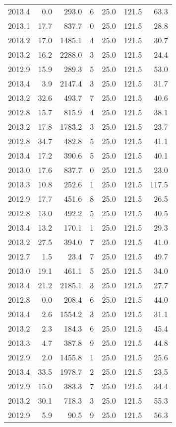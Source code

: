 \begin{tabular}{rrrrrrr}
2013.4 & 0.0 & 293.0 & 6 & 25.0 & 121.5 & 63.3 \\
2013.1 & 17.7 & 837.7 & 0 & 25.0 & 121.5 & 28.8 \\
2013.2 & 17.0 & 1485.1 & 4 & 25.0 & 121.5 & 30.7 \\
2013.2 & 16.2 & 2288.0 & 3 & 25.0 & 121.5 & 24.4 \\
2012.9 & 15.9 & 289.3 & 5 & 25.0 & 121.5 & 53.0 \\
2013.4 & 3.9 & 2147.4 & 3 & 25.0 & 121.5 & 31.7 \\
2013.2 & 32.6 & 493.7 & 7 & 25.0 & 121.5 & 40.6 \\
2012.8 & 15.7 & 815.9 & 4 & 25.0 & 121.5 & 38.1 \\
2013.2 & 17.8 & 1783.2 & 3 & 25.0 & 121.5 & 23.7 \\
2012.8 & 34.7 & 482.8 & 5 & 25.0 & 121.5 & 41.1 \\
2013.4 & 17.2 & 390.6 & 5 & 25.0 & 121.5 & 40.1 \\
2013.0 & 17.6 & 837.7 & 0 & 25.0 & 121.5 & 23.0 \\
2013.3 & 10.8 & 252.6 & 1 & 25.0 & 121.5 & 117.5 \\
2012.9 & 17.7 & 451.6 & 8 & 25.0 & 121.5 & 26.5 \\
2012.8 & 13.0 & 492.2 & 5 & 25.0 & 121.5 & 40.5 \\
2013.4 & 13.2 & 170.1 & 1 & 25.0 & 121.5 & 29.3 \\
2013.2 & 27.5 & 394.0 & 7 & 25.0 & 121.5 & 41.0 \\
2012.7 & 1.5 & 23.4 & 7 & 25.0 & 121.5 & 49.7 \\
2013.0 & 19.1 & 461.1 & 5 & 25.0 & 121.5 & 34.0 \\
2013.4 & 21.2 & 2185.1 & 3 & 25.0 & 121.5 & 27.7 \\
2012.8 & 0.0 & 208.4 & 6 & 25.0 & 121.5 & 44.0 \\
2013.4 & 2.6 & 1554.2 & 3 & 25.0 & 121.5 & 31.1 \\
2013.2 & 2.3 & 184.3 & 6 & 25.0 & 121.5 & 45.4 \\
2013.3 & 4.7 & 387.8 & 9 & 25.0 & 121.5 & 44.8 \\
2012.9 & 2.0 & 1455.8 & 1 & 25.0 & 121.5 & 25.6 \\
2013.4 & 33.5 & 1978.7 & 2 & 25.0 & 121.5 & 23.5 \\
2012.9 & 15.0 & 383.3 & 7 & 25.0 & 121.5 & 34.4 \\
2013.2 & 30.1 & 718.3 & 3 & 25.0 & 121.5 & 55.3 \\
2012.9 & 5.9 & 90.5 & 9 & 25.0 & 121.5 & 56.3 \\

\end{tabular}
